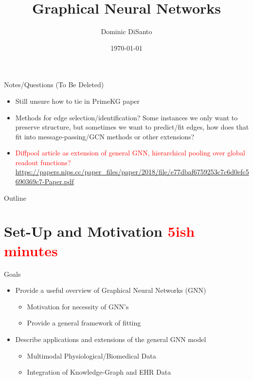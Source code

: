\documentclass{beamer}
\title{Graphical Neural Networks}
\author{Dominic DiSanto}
\institute[]{Department of Biostatistics, Harvard University}
\date{\today}
\begin{document}
\begin{frame}[allowframebreaks]{Notes/Questions (To Be Deleted)}
    \begin{itemize}
        \item Still unsure how to tie in PrimeKG paper
        \item Methods for edge selection/identification? Some instances we only want to preserve structure, but sometimes we want to predict/fit edges, how does that fit into message-passing/GCN methods or other extensions? 
        \item \textcolor{red}{Diffpool article as extension of general GNN, hierarchical pooling over global readout functions?} \url{https://papers.nips.cc/paper_files/paper/2018/file/e77dbaf6759253c7c6d0efc5690369c7-Paper.pdf}
    \end{itemize}
\end{frame}


\begin{frame}
\maketitle
\end{frame}

\begin{frame}{Outline}
\tableofcontents 
\end{frame}


\section{Set-Up and Motivation \textcolor{red}{5ish minutes}}

\begin{frame}{Goals}
    \begin{itemize}\setlength\itemsep{8mm}
        \item Provide a useful overview of Graphical Neural Networks (GNN)
        \begin{itemize}
            \item Motivation for necessity of GNN's 
            \item Provide a general framework of fitting 
        \end{itemize}
        \item Describe applications and extensions of the general GNN model 
        \begin{itemize}
            \item Multimodal Physiological/Biomedical Data
            \item Integration of Knowledge-Graph and EHR Data
        \end{itemize}
    \end{itemize}
\end{frame}
\end{document}
